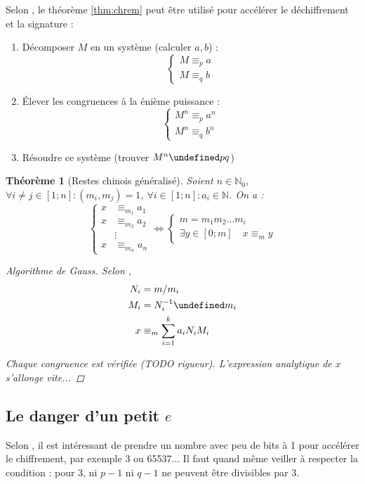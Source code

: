 \documentclass[11pt,twocolumn]{article}
\let\mod\undefined
\DeclareMathOperator{\mod}{mod}
\theoremstyle{plain}
\newtheorem{thm}{Théorème}
\newcommand{\esN}{\mathbb{N}} %
\newcommand{\dbi}{\Longleftrightarrow}
\begin{document}
Selon \cite[p. 611]{hac}, le théorème \ref{thm:chrem} peut être utilisé
pour accélérer le déchiffrement et la signature :
\begin{enumerate}
	\item Décomposer $M$ en un système (calculer $a, b$) : \[
		\left\{\begin{array}{ll}
			M \equiv_p a \\
			M \equiv_q b
		\end{array}\right.
	\]
	\item Élever les congruences à la énième puissance : \[
		\left\{\begin{array}{ll}
			M^n \equiv_p a^n \\
			M^n \equiv_q b^n
		\end{array}\right.
	\]
	\item Résoudre ce système (trouver $M^n \mod pq$)
\end{enumerate}

\begin{thm}[Restes chinois généralisé]\label{thm:chremg}
	Soient $n \in \esN_0$,
	$\forall i\neq j \in [1;n] : (m_i,m_j)=1$,
	$\forall i \in [1;n] : a_i \in \esN$.
	On a : \[
		\left\{\begin{array}{ll}
			x &\equiv_{m_1} a_1 \\
			x &\equiv_{m_2} a_2 \\
			&\vdots \\
			x &\equiv_{m_n} a_n
		\end{array}\right.
		\dbi
		\left\{\begin{array}{l}
			m=m_1m_2\dots m_i \\
			\exists y \in [0;m] \quad x \equiv_m y
		\end{array}\right.
	\]
	\begin{proof}[Algorithme de Gauss] Selon \cite[p. 68]{hac},
		\begin{align*}
			N_i &= m/m_i \\
			M_i &= N_i^{-1} \mod m_i \\
			x &\equiv_m \sum_{i=1}^k a_iN_iM_i
		\end{align*}

		Chaque congruence est vérifiée (TODO rigueur).
		L'expression analytique de $x$ s'allonge vite...
	\end{proof}
\end{thm}

\subsection{Le danger d'un petit $e$}
Selon \cite[p. 288]{hac}, il est intéressant de prendre un nombre avec
peu de bits à 1 pour accélérer le chiffrement, par exemple 3 ou 65537...
Il faut quand même veiller à respecter la condition : pour 3, ni $p-1$ ni $q-1$
ne peuvent être divisibles par 3.
\end{document}
